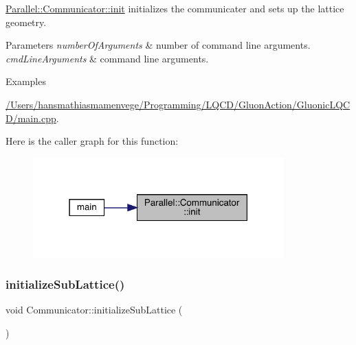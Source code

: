 \mbox{\hyperlink{class_parallel_1_1_communicator_a4ed2a77c33cd899b31131e44fc906fd7}{Parallel\+::\+Communicator\+::init}} initializes the communicater and sets up the lattice geometry. 


\begin{DoxyParams}{Parameters}
{\em number\+Of\+Arguments} & number of command line arguments. \\
\hline
{\em cmd\+Line\+Arguments} & command line arguments. \\
\hline
\end{DoxyParams}
\begin{Desc}
\item[Examples]\par
\mbox{\hyperlink{_2_users_2hansmathiasmamenvege_2_programming_2_l_q_c_d_2_gluon_action_2_gluonic_l_q_c_d_2main_8cpp-example}{/\+Users/hansmathiasmamenvege/\+Programming/\+L\+Q\+C\+D/\+Gluon\+Action/\+Gluonic\+L\+Q\+C\+D/main.\+cpp}}.\end{Desc}
Here is the caller graph for this function\+:
\nopagebreak
\begin{figure}[H]
\begin{center}
\leavevmode
\includegraphics[width=274pt]{class_parallel_1_1_communicator_a4ed2a77c33cd899b31131e44fc906fd7_icgraph}
\end{center}
\end{figure}
\mbox{\label{class_parallel_1_1_communicator_a3094d713d09225738ecf0250019db115}} 
\subsubsection{\texorpdfstring{initializeSubLattice()}{initializeSubLattice()}}
{\footnotesize\ttfamily void Communicator\+::initialize\+Sub\+Lattice (\begin{DoxyParamCaption}{ }\end{DoxyParamCaption})\hspace{0.3cm}{\ttfamily [static]}}



